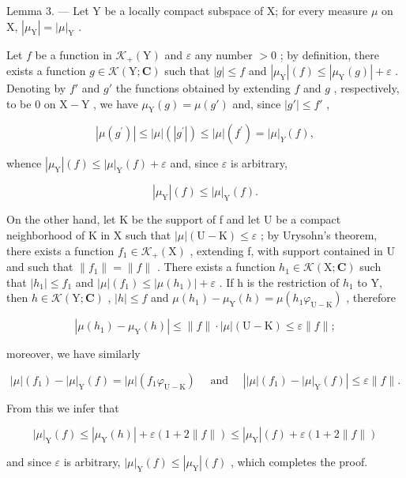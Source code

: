 Lemma 3. --- Let Y be a locally compact subspace of X; for every measure \(\mu\) on X, \(|\mu_{\mathrm{Y}}| = |\mu|_{\mathrm{Y}}\) .

Let \(f\) be a function in \(\mathcal{K}_{+}(\mathrm{Y})\) and \(\varepsilon\) any number \(>0\) ; by definition, there exists a function \(g \in \mathcal{K}(\mathrm{Y};\mathbf{C})\) such that \(|g| \leqslant f\) and \(|\mu_{\mathrm{Y}}|(f) \leqslant |\mu_{\mathrm{Y}}(g)| + \varepsilon\) . Denoting by \(f'\) and \(g'\) the functions obtained by extending \(f\) and \(g\) , respectively, to be 0 on \(\mathrm{X} - \mathrm{Y}\) , we have \(\mu_{\mathrm{Y}}(g) = \mu(g')\) and, since \(|g'| \leqslant f'\) ,

\[
\left| \mu \left(g ^ {\prime}\right) \right| \leqslant | \mu | \left(\left| g ^ {\prime} \right|\right) \leqslant | \mu | \left(f ^ {\prime}\right) = | \mu | _ {Y} (f),
\]

whence \(|\mu_{\mathrm{Y}}|(f)\leqslant |\mu |_{\mathrm{Y}}(f) + \varepsilon\) and, since \(\varepsilon\) is arbitrary,

\[
| \mu_ {\mathrm{Y}} | (f) \leqslant | \mu | _ {\mathrm{Y}} (f).
\]

On the other hand, let K be the support of f and let U be a compact neighborhood of K in X such that \(|\mu|(\mathrm{U}-\mathrm{K}) \leqslant \varepsilon\) ; by Urysohn's theorem, there exists a function \(f_{1} \in \mathcal{K}_{+}(\mathrm{X})\) , extending f, with support contained in U and such that \(\|f_{1}\| = \|f\|\) . There exists a function \(h_{1} \in \mathcal{K}(\mathrm{X}; \mathbf{C})\) such that \(|h_{1}| \leqslant f_{1}\) and \(|\mu|(f_{1}) \leqslant |\mu(h_{1})| + \varepsilon\) . If h is the restriction of \(h_{1}\) to Y, then \(h \in \mathcal{K}(\mathrm{Y}; \mathbf{C})\) , \(|h| \leqslant f\) and \(\mu(h_{1}) - \mu_{\mathrm{Y}}(h) = \mu(h_{1}\varphi_{\mathrm{U}-\mathrm{K}})\) , therefore

\[
\left| \mu \left(h _ {1}\right) - \mu_ {\mathrm{Y}} (h) \right| \leqslant \| f \| \cdot | \mu | (\mathrm{U} - \mathrm{K}) \leqslant \varepsilon \| f \|;
\]

moreover, we have similarly

\[
| \mu | (f _ {1}) - | \mu | _ {\mathrm{Y}} (f) = | \mu | (f _ {1} \varphi_ {\mathrm{U} - \mathrm{K}}) \quad \text { and } \quad \left| | \mu | (f _ {1}) - | \mu | _ {\mathrm{Y}} (f) \right| \leqslant \varepsilon \| f \|.
\]

From this we infer that

\[
| \mu | _ {\mathrm{Y}} (f) \leqslant | \mu_ {\mathrm{Y}} (h) | + \varepsilon (1 + 2 \| f \|) \leqslant | \mu_ {\mathrm{Y}} | (f) + \varepsilon (1 + 2 \| f \|)
\]

and since \(\varepsilon\) is arbitrary, \(|\mu|_{\mathrm{Y}}(f) \leqslant |\mu_{\mathrm{Y}}|(f)\) , which completes the proof.

